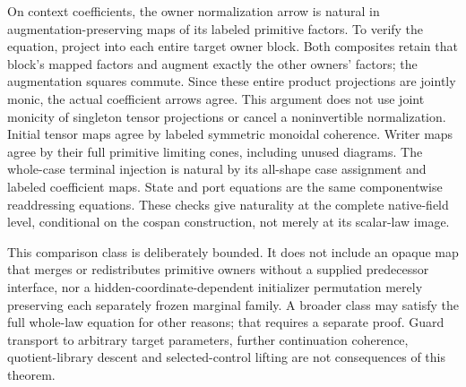 \documentclass[11pt]{article}\usepackage{amsmath,amssymb,amsthm,geometry}\geometry{margin=1in}
\begin{document}
On context coefficients, the owner normalization arrow is natural in augmentation-preserving maps of its labeled primitive factors. To verify the equation, project into each entire target owner block. Both composites retain that block's mapped factors and augment exactly the other owners' factors; the augmentation squares commute. Since these entire product projections are jointly monic, the actual coefficient arrows agree. This argument does not use joint monicity of singleton tensor projections or cancel a noninvertible normalization. Initial tensor maps agree by labeled symmetric monoidal coherence. Writer maps agree by their full primitive limiting cones, including unused diagrams. The whole-case terminal injection is natural by its all-shape case assignment and labeled coefficient maps. State and port equations are the same componentwise readdressing equations. These checks give naturality at the complete native-field level, conditional on the cospan construction, not merely at its scalar-law image.

This comparison class is deliberately bounded. It does not include an opaque map that merges or redistributes primitive owners without a supplied predecessor interface, nor a hidden-coordinate-dependent initializer permutation merely preserving each separately frozen marginal family. A broader class may satisfy the full whole-law equation for other reasons; that requires a separate proof. Guard transport to arbitrary target parameters, further continuation coherence, quotient-library descent and selected-control lifting are not consequences of this theorem.
\end{document}
